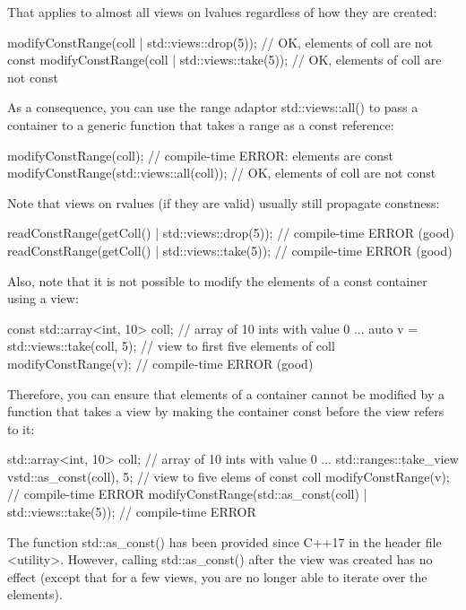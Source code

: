 That applies to almost all views on lvalues regardless of how they are created:

\begin{cpp}
modifyConstRange(coll | std::views::drop(5)); // OK, elements of coll are not const
modifyConstRange(coll | std::views::take(5)); // OK, elements of coll are not const
\end{cpp}

As a consequence, you can use the range adaptor std::views::all() to pass a container to a generic function that takes a range as a const reference:

\begin{cpp}
modifyConstRange(coll); // compile-time ERROR: elements are const
modifyConstRange(std::views::all(coll)); // OK, elements of coll are not const
\end{cpp}

Note that views on rvalues (if they are valid) usually still propagate constness:

\begin{cpp}
readConstRange(getColl() | std::views::drop(5)); // compile-time ERROR (good)
readConstRange(getColl() | std::views::take(5)); // compile-time ERROR (good)
\end{cpp}

Also, note that it is not possible to modify the elements of a const container using a view:

\begin{cpp}
const std::array<int, 10> coll{}; // array of 10 ints with value 0
...
auto v = std::views::take(coll, 5); // view to first five elements of coll
modifyConstRange(v); // compile-time ERROR (good)
\end{cpp}

Therefore, you can ensure that elements of a container cannot be modified by a function that takes a view by making the container const before the view refers to it:

\begin{cpp}
std::array<int, 10> coll{}; // array of 10 ints with value 0
...
std::ranges::take_view v{std::as_const(coll), 5}; // view to five elems of const coll
modifyConstRange(v); // compile-time ERROR
modifyConstRange(std::as_const(coll) | std::views::take(5)); // compile-time ERROR
\end{cpp}

The function std::as\_const() has been provided since C++17 in the header file <utility>. However, calling std::as\_const() after the view was created has no effect (except that for a few views, you are no longer able to iterate over the elements).


